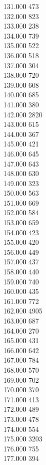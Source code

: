 { 131.000	473 \\
 132.000	823 \\
 133.000	238 \\
 134.000	739 \\
 135.000	522 \\
 136.000	518 \\
 137.000	304 \\
 138.000	720 \\
 139.000	608 \\
 140.000	685 \\
 141.000	380 \\
 142.000	2820 \\
 143.000	615 \\
 144.000	367 \\
 145.000	421 \\
 146.000	645 \\
 147.000	643 \\
 148.000	630 \\
 149.000	323 \\
 150.000	563 \\
 151.000	669 \\
 152.000	584 \\
 153.000	659 \\
 154.000	423 \\
 155.000	420 \\
 156.000	449 \\
 157.000	437 \\
 158.000	440 \\
 159.000	740 \\
 160.000	435 \\
 161.000	772 \\
 162.000	4905 \\
 163.000	687 \\
 164.000	270 \\
 165.000	431 \\
 166.000	642 \\
 167.000	784 \\
 168.000	570 \\
 169.000	702 \\
 170.000	370 \\
 171.000	413 \\
 172.000	489 \\
 173.000	478 \\
 174.000	554 \\
 175.000	3203 \\
 176.000	755 \\
 177.000	394 \\
}
